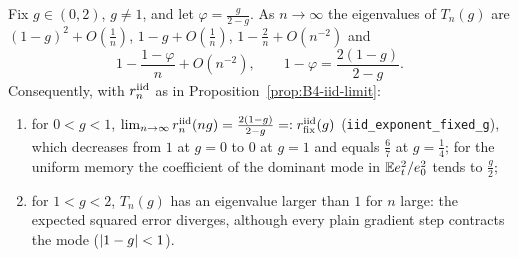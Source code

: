 \begin{proposition}\label{prop:B4-iid-fixed}
Fix $g\in(0,2)$, $g\ne1$, and let $\varphi=\frac g{2-g}$. As $n\to\infty$ the eigenvalues of $T_n(g)$ are $(1-g)^2+O(\frac1n)$, $1-g+O(\frac1n)$, $1-\frac2n+O(n^{-2})$ and
\[
1-\frac{1-\varphi}n+O(n^{-2}),\qquad 1-\varphi=\frac{2(1-g)}{2-g}.
\]
Consequently, with $r^{\rm iid}_n$ as in Proposition~\ref{prop:B4-iid-limit}:
\begin{enumerate}[label=(\alph*)]
\item for $0<g<1$, $\lim_{n\to\infty}r^{\rm iid}_n(ng)=\frac{2(1-g)}{2-g}=:r^{\rm iid}_{\rm fix}(g)$ (\texttt{iid\_exponent\_fixed\_g}), which decreases from $1$ at $g=0$ to $0$ at $g=1$ and equals $\frac67$ at $g=\frac14$; for the uniform memory the coefficient of the dominant mode in $\mathbb{E} e_t^2/e_0^2$ tends to $\frac g2$;
\item for $1<g<2$, $T_n(g)$ has an eigenvalue larger than $1$ for $n$ large: the expected squared error diverges, although every plain gradient step contracts the mode ($\left|1-g\right|<1$).
\end{enumerate}
\end{proposition}
